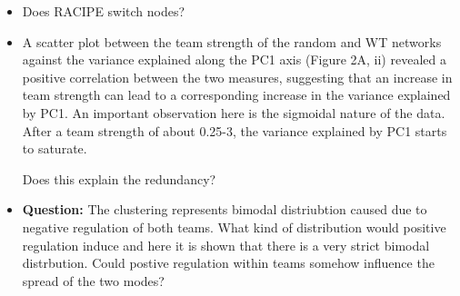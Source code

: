 \documentclass{article}
\begin{document}
\begin{itemize}
\item Does RACIPE switch nodes? 


\item  A scatter plot
between the team strength of the random and WT networks against the variance explained along the
PC1 axis (Figure 2A, ii) revealed a positive correlation between the two measures, suggesting that an
increase in team strength can lead to a corresponding increase in the variance explained by PC1. An
important observation here is the sigmoidal nature of the data. After a team strength of about 0.25-3,
the variance explained by PC1 starts to saturate.

Does this explain the redundancy? 


\item \textbf{ Question: } The clustering represents bimodal distriubtion caused due to negative regulation of both teams. What kind of distribution would positive regulation induce and here it is shown that there is a very strict bimodal distrbution. Could postive regulation within teams somehow influence the spread of the two modes?

\end{itemize}
\end{document}
